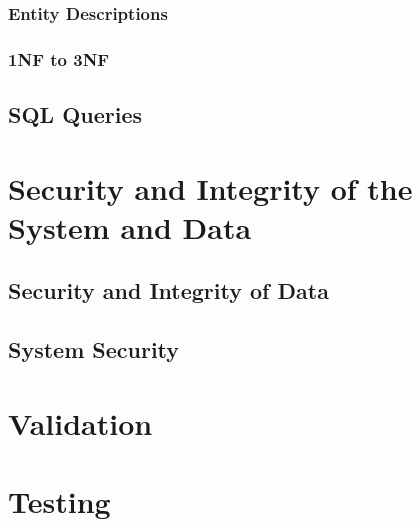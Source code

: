 \subsubsection{Entity Descriptions}

\subsubsection{1NF to 3NF}

\subsection{SQL Queries}

\section{Security and Integrity of the System and Data}

\subsection{Security and Integrity of Data}

\subsection{System Security}

\section{Validation}

\section{Testing}

